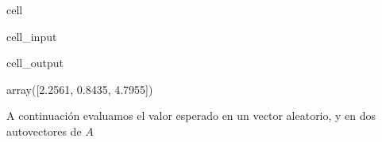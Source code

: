 \documentclass[letterpaper,10pt,english]{jupyterBook}
\begin{document}
\begin{sphinxuseclass}{cell}\begin{sphinxVerbatimInput}

\begin{sphinxuseclass}{cell_input}
\begin{sphinxVerbatim}[commandchars=\\\{\}]

    
   

   

\end{sphinxVerbatim}

\end{sphinxuseclass}\end{sphinxVerbatimInput}
\begin{sphinxVerbatimOutput}

\begin{sphinxuseclass}{cell_output}
\begin{sphinxVerbatim}[commandchars=\\\{\}]
array([\PYGZhy{}2.2561,  0.8435,  4.7955])
\end{sphinxVerbatim}

\end{sphinxuseclass}\end{sphinxVerbatimOutput}

\end{sphinxuseclass}
\sphinxAtStartPar
A continuación evaluamos el valor esperado en un vector aleatorio, y en dos autovectores de \(A\)
\end{document}
